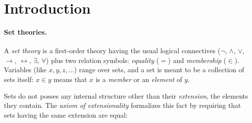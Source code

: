 \documentclass[sigplan,10pt,anonymous,review]{acmart}\settopmatter{printfolios=true,printccs=false,printacmref=false}
\begin{document}


\maketitle

\section{Introduction}


\paragraph{Set theories.}
A \emph{set theory} is a first-order theory having the usual logical connectives ($\neg$, $\land$, $\lor$, $\to$, $\leftrightarrow$, $\exists$, $\forall$) plus two relation symbols: \emph{equality} ($=$) and \emph{membership} ($\in$). Variables (like $x,y,z,\ldots$) range over sets, and a set is meant to be a collection of sets itself: $x \in y$ means that $x$ is a \emph{member} or an \emph{element} of $y$.



Sets do not posses any internal structure other than their \emph{extension}, \ie{} the elements they contain. The \emph{axiom of extensionality} formalizes this fact by requiring that sets having the same extension are equal:
\end{document}
